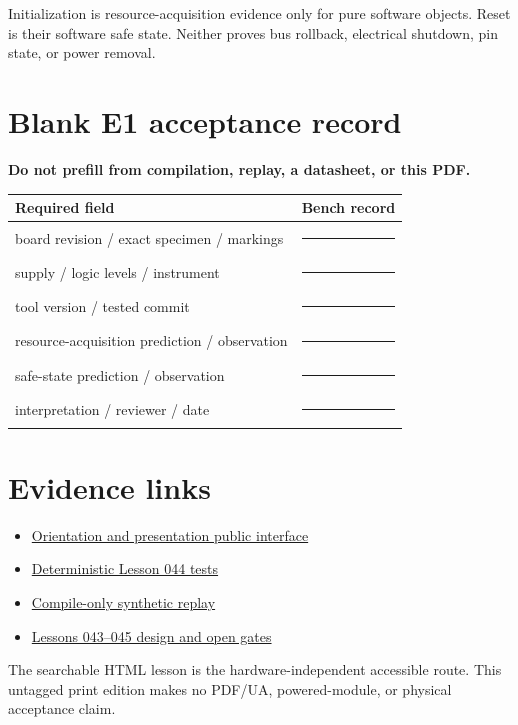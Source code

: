 \documentclass[11pt]{article}
\newcommand{\blankline}{\rule{0.86in}{0.4pt}}
\begin{document}
Initialization is resource-acquisition evidence only for pure software
objects. Reset is their software safe state. Neither proves bus rollback,
electrical shutdown, pin state, or power removal.

\section{Blank E1 acceptance record}
\textbf{Do not prefill from compilation, replay, a datasheet, or this PDF.}
\par\smallskip
\begin{tabularx}{\linewidth}{@{}>{\raggedright\arraybackslash}X X@{}}
\toprule
Required field & Bench record\\
\midrule
board revision / exact specimen / markings & \blankline\\[6pt]
supply / logic levels / instrument & \blankline\\[6pt]
tool version / tested commit & \blankline\\[6pt]
resource-acquisition prediction / observation & \blankline\\[6pt]
safe-state prediction / observation & \blankline\\[6pt]
interpretation / reviewer / date & \blankline\\
\bottomrule
\end{tabularx}

\section{Evidence links}
\begin{itemize}
 \item \href{https://github.com/spincyc/adk/blob/main/src/orientation_presentation.h}
       {Orientation and presentation public interface}
 \item \href{https://github.com/spincyc/adk/blob/main/tests/test_orientation_presentation.cpp}
       {Deterministic Lesson 044 tests}
 \item \href{https://github.com/spincyc/adk/blob/main/examples/Lesson044OrientationPresentation/Lesson044OrientationPresentation.ino}
       {Compile-only synthetic replay}
 \item \href{https://github.com/spincyc/adk/blob/main/docs/design/LESSONS_043_045_BALANCE_TABLE_PLAN.md}
       {Lessons 043--045 design and open gates}
\end{itemize}
The searchable HTML lesson is the hardware-independent accessible route.
This untagged print edition makes no PDF/UA, powered-module, or physical
acceptance claim.
\end{document}
